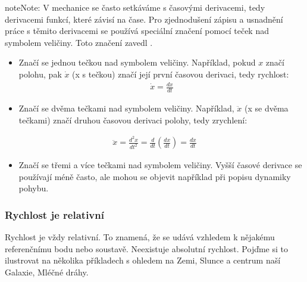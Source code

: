 \documentclass[letterpaper,10pt,english]{jupyterBook}
\begin{document}
\begin{sphinxadmonition}{note}{Note:}
\sphinxAtStartPar
V mechanice se často setkáváme s časovými derivacemi, tedy derivacemi funkcí, které závisí na čase. Pro zjednodušení zápisu a usnadnění práce s těmito derivacemi se používá speciální značení pomocí teček nad symbolem veličiny. Toto značení zavedl .
\begin{itemize}
\item {} 
\sphinxAtStartPar
{} Značí se jednou tečkou nad symbolem veličiny. Například, pokud \(x\) značí polohu, pak \(\dot{x}\) (x s tečkou) značí její první časovou derivaci, tedy rychlost:
\begin{equation*}
\begin{split}\dot{x} = \frac{dx}{dt}\end{split}
\end{equation*}
\item {} 
\sphinxAtStartPar
{} Značí se dvěma tečkami nad symbolem veličiny. Například, \(\ddot{x}\) (x se dvěma tečkami) značí druhou časovou derivaci polohy, tedy zrychlení:

\end{itemize}
\begin{equation*}
\begin{split}\ddot{x} = \frac{d^2x}{dt^2} = \frac{d}{dt}\left(\frac{dx}{dt}\right) = \frac{d\dot{x}}{dt}\end{split}
\end{equation*}\begin{itemize}
\item {} 
\sphinxAtStartPar
{} Značí se třemi a více tečkami nad symbolem veličiny. Vyšší časové derivace se používají méně často, ale mohou se objevit například při popisu dynamiky pohybu.

\end{itemize}
\end{sphinxadmonition}


\subsubsection{Rychlost je relativní}
\label{\detokenize{Prednasky/1_2_Kinematika_v_1D:rychlost-je-relativni}}
\sphinxAtStartPar
Rychlost je vždy relativní. To znamená, že se udává vzhledem k nějakému referenčnímu bodu nebo soustavě. Neexistuje absolutní rychlost. Pojďme si to ilustrovat na několika příkladech s ohledem na Zemi, Slunce a centrum naší Galaxie, Mléčné dráhy.
\end{document}
